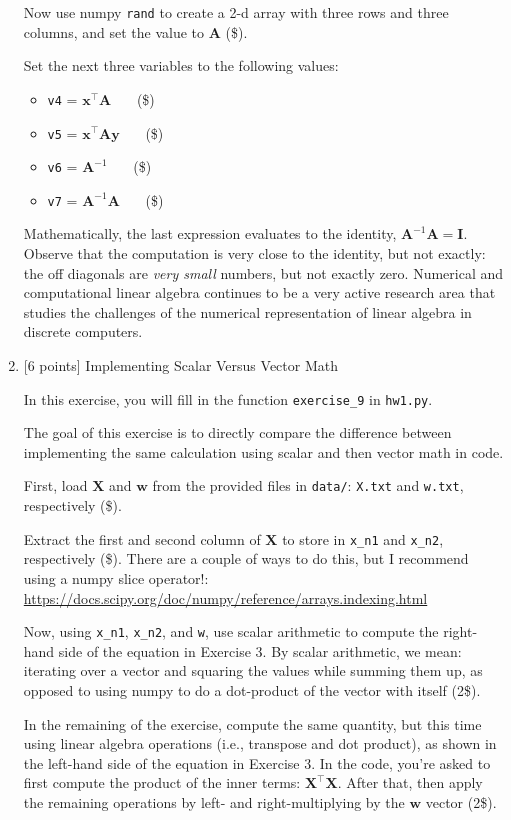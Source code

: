 \documentclass[10pt]{article}
\begin{document}
\begin{enumerate}
Now use numpy {\tt rand} to create a 2-d array with three rows and three columns, and set the value to $\mathbf{A}$ (\$).

Set the next three variables to the following values:
\begin{itemize}
\item {\tt v4} = $\mathbf{x}^\top \mathbf{A}$ ~~~(\$)
\item {\tt v5} = $\mathbf{x}^\top \mathbf{A} \mathbf{y}$ ~~~(\$)
\item {\tt v6} = $\mathbf{A}^{-1}$ ~~~(\$)
\item {\tt v7} = $\mathbf{A}^{-1} \mathbf{A}$ ~~~(\$)
\end{itemize}

Mathematically, the last expression evaluates to the identity,  $\mathbf{A}^{-1} \mathbf{A} = \mathbf{I}$. Observe that the computation is very close to the identity, but not exactly: the off diagonals are {\em very small} numbers, but not exactly zero. Numerical and computational linear algebra continues to be a very active research area that studies the challenges of the numerical representation of linear algebra in discrete computers.




\item \label{prob:9} [6 points]
Implementing Scalar Versus Vector Math

In this exercise, you will fill in the function {\tt exercise\_9} in {\tt hw1.py}.

The goal of this exercise is to directly compare the difference between implementing the same calculation using scalar and then vector math in code.

First, load $\mathbf{X}$ and $\mathbf{w}$ from the provided files in {\tt data/}: {\tt X.txt} and {\tt w.txt}, respectively (\$).

Extract the first and second column of $\mathbf{X}$ to store in {\tt x\_n1} and {\tt x\_n2}, respectively (\$). There are a couple of ways to do this, but I recommend using a numpy slice operator!:\\
\url{https://docs.scipy.org/doc/numpy/reference/arrays.indexing.html}

Now, using {\tt x\_n1}, {\tt x\_n2}, and {\tt w}, use scalar arithmetic to compute the right-hand side of the equation in Exercise 3. By scalar arithmetic, we mean: iterating over a vector and squaring the values while summing them up, as opposed to using numpy to do a dot-product of the vector with itself (2\$).

In the remaining of the exercise, compute the same quantity, but this time using linear algebra operations (i.e., transpose and dot product), as shown in the left-hand side of the equation in Exercise 3. In the code, you're asked to first compute the product of the inner terms: ${\mathbf{X}^\top \mathbf{X}}$. After that, then apply the remaining operations by left- and right-multiplying by the $\mathbf{w}$ vector (2\$).


\end{enumerate}
\end{document}
